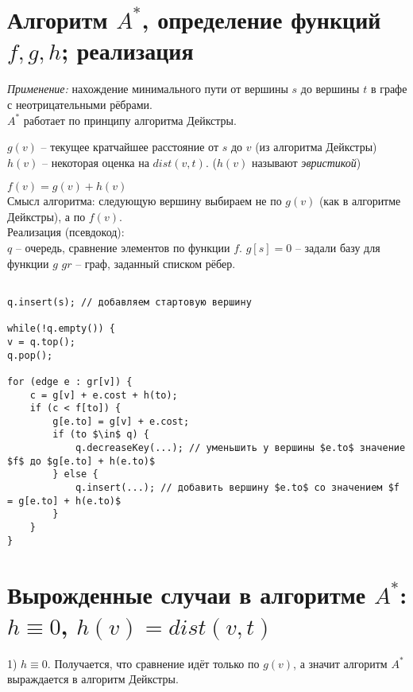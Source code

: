 \setcounter{section}{49}
\section{Алгоритм $A^*$, определение функций $f, g, h$; реализация}

\textit{Применение: } нахождение минимального пути от вершины $s$ до вершины $t$ в графе с неотрицательными рёбрами.\\

$A^*$ работает по принципу алгоритма Дейкстры.

$g(v)$ -- текущее кратчайшее расстояние от $s$ до $v$ (из алгоритма Дейкстры)\\

$h(v)$ -- некоторая оценка на $dist(v, t)$. ($h(v)$ называют \textit{эвристикой})

$f(v) = g(v) + h(v)$\\

Смысл алгоритма: следующую вершину выбираем не по $g(v)$ (как в алгоритме Дейкстры), а по $f(v)$.\\

Реализация (псевдокод): \\

$q$ -- очередь, сравнение элементов по функции $f$.
$g[s] = 0$ -- задали базу для функции $g$
$gr$ -- граф, заданный списком рёбер.

\begin{lstlisting}[mathescape=true]

q.insert(s); // добавляем стартовую вершину

while(!q.empty()) {
v = q.top();
q.pop();

for (edge e : gr[v]) {
    c = g[v] + e.cost + h(to);
    if (c < f[to]) {
        g[e.to] = g[v] + e.cost;
        if (to $\in$ q) {
            q.decreaseKey(...); // уменьшить у вершины $e.to$ значение $f$ до $g[e.to] + h(e.to)$
        } else {
            q.insert(...); // добавить вершину $e.to$ со значением $f = g[e.to] + h(e.to)$
        }
    }
}

\end{lstlisting}


\setcounter{section}{50}
\section{Вырожденные случаи в алгоритме $A^*$: $h \equiv 0$, $h(v) = dist(v, t)$}

1) $h \equiv 0$. Получается, что сравнение идёт только по $g(v)$, а значит алгоритм $A^*$ выраждается в алгоритм Дейкстры.\\

